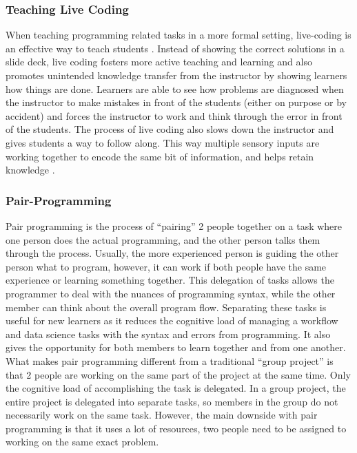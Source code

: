 \documentclass[010-intro.tex]{subfiles}
\begin{document}
        \subsubsection{Teaching Live Coding}

        When teaching programming related tasks in a more formal setting, live-coding is an effective way to teach students . Instead of showing the correct solutions in a slide deck, live coding fosters more active teaching and learning and also promotes unintended knowledge transfer from the instructor by showing learners how things are done. Learners are able to see how problems are diagnosed when the instructor to make mistakes in front of the students (either on purpose or by accident) and forces the instructor to work and think through the error in front of the students. The process of live coding also slows down the instructor and gives students a way to follow along. This way multiple sensory inputs are working together to encode the same bit of information, and helps retain knowledge .

        \subsubsection{Pair-Programming}

        Pair programming is the process of “pairing” 2 people together on a task where one person does the actual programming, and the other person talks them through the process. Usually, the more experienced person is guiding the other person what to program, however, it can work if both people have the same experience or learning something together. This delegation of tasks allows the programmer to deal with the nuances of programming syntax, while the other member can think about the overall program flow. Separating these tasks is useful for new learners as it reduces the cognitive load of managing a workflow and data science tasks with the syntax and errors from programming. It also gives the opportunity for both members to learn together and from one another. What makes pair programming different from a traditional “group project” is that 2 people are working on the same part of the project at the same time. Only the cognitive load of accomplishing the task is delegated. In a group project, the entire project is delegated into separate tasks, so members in the group do not necessarily work on the same task. However, the main downside with pair programming is that it uses a lot of resources, two people need to be assigned to working on the same exact problem.
\end{document}
